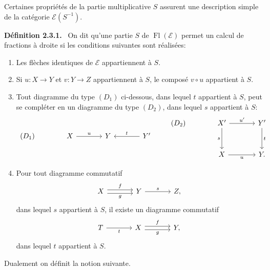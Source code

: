 \documentclass[11pt]{article}
\newenvironment{statement}[1]{\par\medskip\noindent\textbf{#1.}\ }{\par\medskip}
\providecommand{\Fl}{\operatorname{Fl}}
\providecommand{\cE}{\mathcal E}
\begin{document}
Certaines propriétés de la partie multiplicative $S$ assurent une description simple de la catégorie $\cE(S^{-1})$.

\begin{statement}{Définition 2.3.1}
On dit qu'une partie $S$ de $\Fl(\cE)$ permet un calcul de fractions à droite si les conditions suivantes sont réalisées:
\begin{enumerate}[label=(\alph*)]
\item Les flèches identiques de $\cE$ appartiennent à $S$.
\item Si $u:X\to Y$ et $v:Y\to Z$ appartiennent à $S$, le composé $v\circ u$ appartient à $S$.
\item Tout diagramme du type $(D_1)$ ci-dessous, dans lequel $t$ appartient à $S$, peut se compléter en un diagramme du type $(D_2)$, dans lequel $s$ appartient à $S$:
\[
\begin{tikzcd}[column sep=large]
(D_1)& X \arrow[r,"u"] & Y & Y' \arrow[l,"t"']
\end{tikzcd}
\qquad
\begin{tikzcd}[column sep=large,row sep=large]
(D_2)& X' \arrow[r,"u'"] \arrow[d,"s"'] & Y' \arrow[d,"t"]\\
& X \arrow[r,"u"'] & Y .
\end{tikzcd}
\]
\item Pour tout diagramme commutatif
\[
\begin{tikzcd}[column sep=large]
X \arrow[r,shift left,"f"] \arrow[r,shift right,"g"'] & Y \arrow[r,"s"] & Z,
\end{tikzcd}
\]
dans lequel $s$ appartient à $S$, il existe un diagramme commutatif
\[
\begin{tikzcd}[column sep=large]
T \arrow[r,"t"'] & X \arrow[r,shift left,"f"] \arrow[r,shift right,"g"'] & Y,
\end{tikzcd}
\]
dans lequel $t$ appartient à $S$.
\end{enumerate}
\end{statement}

Dualement on définit la notion suivante.
\end{document}
